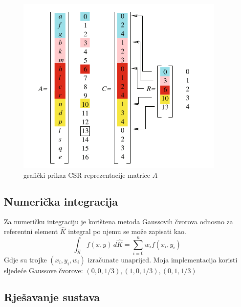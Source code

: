 \documentclass[zavrsnirad]{../fer}
\begin{document}
\begin{figure}[htb]
	\centering
	\includegraphics[width=0.7\linewidth]{Figures/CSR.png}
	\caption{grafički prikaz CSR reprezentacije matrice $A$}
	\label{CSR}
\end{figure}
\newpage
\subsection{Numerička integracija}
Za numeričku integraciju je korištena metoda Gaussovih 
čvorova odnosno za referentni element $\hat{K}$ integral
po njemu se može zapisati kao.
$$\int_{\hat{K}} f(x,y) \, d\hat{K} = \sum_{i = 0}^n w_i f(x_i,y_i)$$
Gdje su trojke $(x_i, y_i, w_i)$ izračunate unaprijed.
Moja implementacija koristi sljedeće Gaussove čvorove:
$(0,0,1/3), (1,0, 1/3),(0,1,1 / 3)$


\subsection{Rješavanje sustava}
\end{document}
